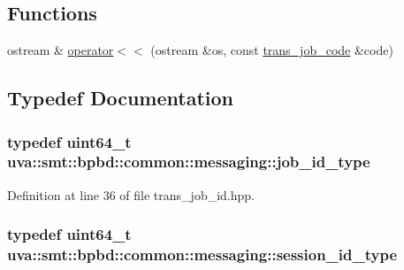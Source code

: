 \subsection*{Functions}
\begin{DoxyCompactItemize}
\item 
ostream \& \hyperlink{namespaceuva_1_1smt_1_1bpbd_1_1common_1_1messaging_a5f985d67f9d927f75f9788ecb56f8f0f}{operator$<$$<$} (ostream \&os, const \hyperlink{classuva_1_1smt_1_1bpbd_1_1common_1_1messaging_1_1trans__job__code}{trans\+\_\+job\+\_\+code} \&code)
\end{DoxyCompactItemize}


\subsection{Typedef Documentation}
\hypertarget{namespaceuva_1_1smt_1_1bpbd_1_1common_1_1messaging_af12d41e7490214ac057969e9d4af1436}{}
\subsubsection[{job\+\_\+id\+\_\+type}]{\setlength{\rightskip}{0pt plus 5cm}typedef uint64\+\_\+t {\bf uva\+::smt\+::bpbd\+::common\+::messaging\+::job\+\_\+id\+\_\+type}}\label{namespaceuva_1_1smt_1_1bpbd_1_1common_1_1messaging_af12d41e7490214ac057969e9d4af1436}


Definition at line 36 of file trans\+\_\+job\+\_\+id.\+hpp.

\hypertarget{namespaceuva_1_1smt_1_1bpbd_1_1common_1_1messaging_a17ad17f94b78abb87ab5f3f3d6f09588}{}
\subsubsection[{session\+\_\+id\+\_\+type}]{\setlength{\rightskip}{0pt plus 5cm}typedef uint64\+\_\+t {\bf uva\+::smt\+::bpbd\+::common\+::messaging\+::session\+\_\+id\+\_\+type}}\label{namespaceuva_1_1smt_1_1bpbd_1_1common_1_1messaging_a17ad17f94b78abb87ab5f3f3d6f09588}


